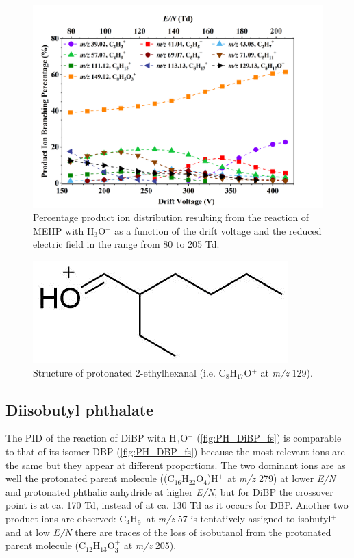 \begin{figure}[htb]%
\centering
\includegraphics[height=0.35\textheight]{pics/MEHP-BR.png}
\caption{Percentage product ion distribution resulting from the reaction of MEHP with H$_3$O$^+$ as a function of the drift voltage and the reduced electric field in the range from 80 to 205 Td.}
\label{fig:PH_MEHP_fs}
\end{figure}


\begin{figure}[htb]%
\centering
\includegraphics[height=0.05\textheight]{pics/PH/MEHP_frag.png}
\caption{Structure of protonated 2-ethylhexanal (i.e. C$_8$H$_{17}$O$^+$ at \textit{m/z} 129).}
\label{fig:PH_MEHP_frag}
\end{figure}




\subsection{Diisobutyl phthalate}

The PID of the reaction of DiBP with H$_3$O$^+$ (\autoref{fig:PH_DiBP_fs}) is comparable to that of its isomer DBP (\autoref{fig:PH_DBP_fs}) because the most relevant ions are the same but they appear at different  proportions.
The two dominant ions are as well the protonated parent molecule ((C$_{16}$H$_{22}$O$_4$)H$^+$ at \textit{m/z} 279) at lower \textit{E/N} and protonated phthalic anhydride at higher \textit{E/N}, but for DiBP the crossover point is at ca. 170 Td, instead of at ca. 130 Td as it occurs for DBP.
Another two product ions are observed:  C$_4$H$_9^+$ at \textit{m/z} 57 is tentatively assigned to isobutyl$^+$ and 
at low \textit{E/N} there are traces of the loss of isobutanol from the protonated parent molecule (C$_{12}$H$_{13}$O$_3^+$ at \textit{m/z} 205).





